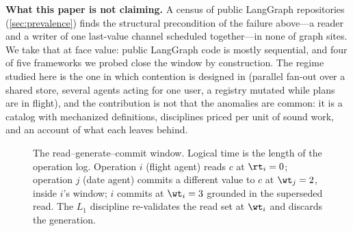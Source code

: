 \smallskip\noindent\textbf{What this paper is not claiming.} A census of
\CensusRepos{} public LangGraph repositories (\cref{sec:prevalence}) finds
the structural precondition of the failure above---a reader and a writer of
one last-value channel scheduled together---in none of \CensusSites{} graph
sites. We take that at face value: public LangGraph code is mostly sequential,
and four of five frameworks we probed close the window by construction. The
regime studied here is the one in which contention is designed in (parallel
fan-out over a shared store, several agents acting for one user, a registry
mutated while plans are in flight), and the contribution is not that the
anomalies are common: it is a catalog with mechanized definitions,
disciplines priced per unit of sound work, and an account of what each
leaves behind.

\begin{figure}[t]
\centering
{}
\caption{The read--generate--commit window. Logical time is the length of the
operation log. Operation $i$ (flight agent) reads $c$ at $\rt_i=0$; operation
$j$ (date agent) commits a different value to $c$ at $\wt_j=2$, inside $i$'s
window; $i$ commits at $\wt_i=3$ grounded in the superseded read. The
$L_1$ discipline re-validates the read set at $\wt_i$ and discards the
generation.}
\label{fig:window}
\end{figure}

